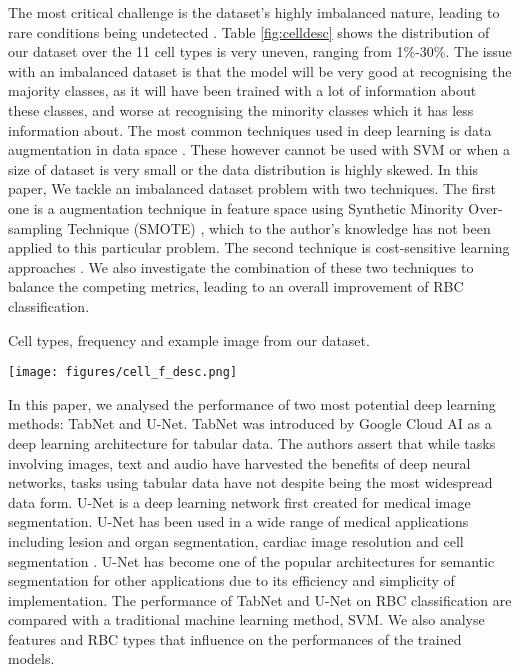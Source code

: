 \documentclass[final,5p,times,twocolumn,authoryear]{elsarticle}
\begin{document}
The most critical challenge is the dataset’s highly imbalanced nature, leading to rare conditions being undetected \citep{Litjens2017AAnalysis, Ker2017DeepAnalysis}. Table \ref{fig:celldesc} shows the distribution of our dataset over the 11 cell types is very uneven, ranging from 1\%-30\%. The issue with an imbalanced dataset is that the model will be very good at recognising the majority classes, as it will have been trained with a lot of information about these classes, and worse at recognising the minority classes which it has less information about. The most common techniques used in deep learning is  data augmentation in data space \citep{Anantrasirichai:Application:2018, Korranat:red:2021}. These however cannot be used with SVM or when a size of dataset is very small or the data distribution is highly skewed. In this paper, We tackle an imbalanced dataset problem with two techniques. The first one is a augmentation technique in feature space using Synthetic Minority Over-sampling Technique (SMOTE) \citep{Chawla2002SMOTE:Technique}, which to the author’s knowledge has not been applied to this particular problem. The second technique is cost-sensitive learning approaches \citep{He2009LearningData}. We also investigate the combination of these two techniques to balance the competing metrics, leading to an overall improvement of RBC classification.

\begin{table}[t!]
	\caption[Cell distribution in dataset]{Cell types, frequency and example image from our dataset.}
	\centering
	\texttt{[image: figures/cell\_f\_desc.png]}
	\label{fig:celldesc}
\end{table}


In this paper, we analysed the performance of two most potential deep learning methods: TabNet and U-Net. TabNet was introduced by Google Cloud AI \citep{Arik2019TabNet:Learning} as a deep learning architecture for tabular data. The authors assert that while tasks involving images, text and audio have harvested the benefits of deep neural networks, tasks using tabular data have not despite being the most widespread data form. U-Net \citep{RonnebergerU-Net:Segmentation} is a deep learning network first created for medical image segmentation. U-Net has been used in a wide range of medical applications including lesion and organ segmentation, cardiac image resolution and cell segmentation \citep{Litjens2017AAnalysis}. U-Net has become one of the popular architectures for semantic segmentation for other applications due to its efficiency and simplicity of implementation. 
The performance of TabNet and U-Net on RBC classification are compared with a traditional machine learning method, SVM. We also analyse features and RBC types that influence on the performances of the trained models.
\end{document}
